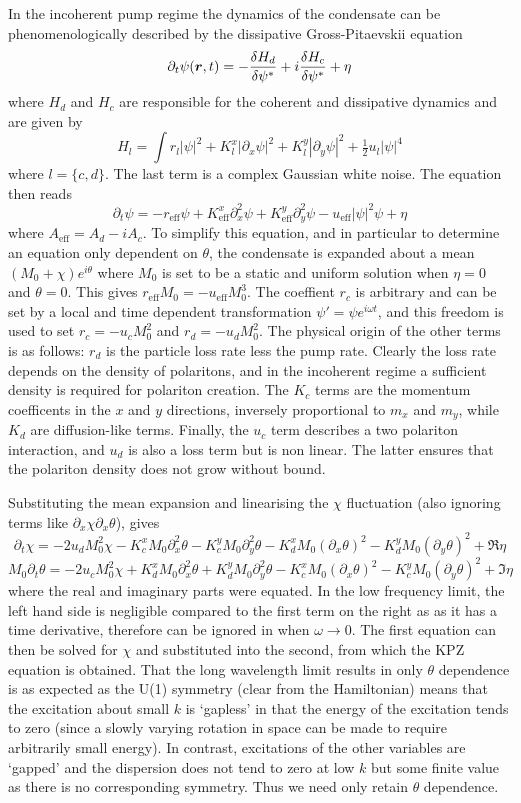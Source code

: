 In the incoherent pump regime the dynamics of the condensate can be phenomenologically described by the dissipative Gross-Pitaevskii equation \cite{2015PhRvX...5a1017A}
\[
\partial_t \psi(\boldsymbol{r}, t) = - \frac{\delta H_d}{\delta \psi^*} + i\frac{\delta H_c}{\delta \psi^*} + \eta
\]
where $H_d$ and $H_c$ are responsible for the coherent and dissipative dynamics and are given by 
\[
H_l = \int r_l |\psi|^2 + K_l^x|\partial_x \psi|^2 + K_l^y|\partial_y \psi|^2 + \tfrac12 u_l |\psi|^4
\]
where $l=\{c, d\}$. The last term is a complex Gaussian white noise. The equation then reads
\[
\partial_t \psi = -r_\text{eff}\psi +K^x_{\text{eff}}\partial_x^2\psi +K^y_{\text{eff}}\partial_y^2\psi -u_{\text{eff}}|\psi|^2\psi + \eta
\]
where $A_{\text{eff}} = A_d -iA_c.$ To simplify this equation, and in particular to determine an equation only dependent on $\theta$, the condensate is expanded about a mean $(M_0 + \chi)e^{i\theta}$ where $M_0$ is set to be a static and uniform solution when $\eta = 0$ and $\theta=0$. This gives $r_{\text{eff}}M_0 = -u_{\text{eff}}M_0^3$. The coeffient $r_c$ is arbitrary and can be set by a local and time dependent transformation $\psi' = \psi e^{i \omega t}$, and this freedom is used to set $r_c = -u_cM_0^2$ and $r_d = -u_dM_0^2$. The physical origin of the other terms is as follows: $r_d$ is the particle loss rate less the pump rate. Clearly the loss rate depends on the density of polaritons, and in the incoherent regime a sufficient density is required for polariton creation. The $K_c$ terms are the momentum coefficents in the $x$ and $y$ directions, inversely proportional to $m_x$ and $m_y$, while $K_d$ are diffusion-like terms. Finally, the $u_c$ term describes a two polariton interaction, and $u_d$ is also a loss term but is non linear. The latter ensures that the polariton density does not grow without bound. 

Substituting the mean expansion and linearising the $\chi$ fluctuation (also ignoring terms like $\partial_x \chi \partial_x \theta$), gives
\[
\partial_t \chi = -2u_d M_0^2 \chi - K_c^x M_0 \partial_x^2 \theta -K_c^y M_0 \partial_y^2 \theta - K_d^x M_0(\partial_x \theta)^2 -K_d^y M_0(\partial_y \theta)^2 + \Re \eta
\]
\[
M_0\partial_t \theta = -2u_c M_0^2 \chi + K_d^x M_0 \partial_x^2 \theta +K_d^y M_0 \partial_y^2 \theta - K_c^x M_0(\partial_x \theta)^2 -K_c^y M_0(\partial_y \theta)^2 + \Im \eta
\]
where the real and imaginary parts were equated. In the low frequency limit, the left hand side is negligible compared to the first term on the right as as it has a time derivative, therefore can be ignored in when $\omega \to 0$. The first equation can then be solved for $\chi$ and substituted into the second, from which the KPZ equation is obtained. That the long wavelength limit results in only $\theta$ dependence is as expected as the U(1) symmetry (clear from the Hamiltonian) means that the excitation about small $k$ is `gapless' in that the energy of the excitation tends to zero (since a slowly varying rotation in space can be made to require arbitrarily small energy). In contrast, excitations of the other variables are `gapped' and the dispersion does not tend to zero at low $k$ but some finite value as there is no corresponding symmetry. Thus we need only retain $\theta$ dependence.

